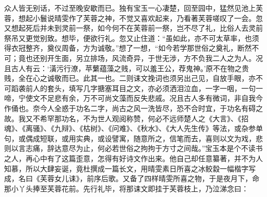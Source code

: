 \begin{parag}
    众人皆无别话，不过至晚安歇而已。独有宝玉一心凄楚，回至园中，猛然见池上芙蓉，想起小鬟说晴雯作了芙蓉之神，不觉又喜欢起来，乃看著芙蓉嗟叹了一会。忽又想起死后并未到灵前一祭，如今何不在芙蓉前一祭，岂不尽了礼，比俗人去灵前祭吊又更觉别致。想毕，便欲行礼。忽又止住道：“虽如此，亦不可太草率，也须得衣冠整齐，奠仪周备，方为诚敬。”想了一想，“如今若学那世俗之奠礼，断然不可；竟也还别开生面，另立排场，风流奇异，于世无涉，方不负我二人之为人。况且古人有云：‘潢污行潦，苹蘩蕴藻之贱，可以羞王公，荐鬼神。’原不在物之贵贱，全在心之诚敬而已。此其一也。二则诔文挽词也须另出己见，自放手眼，亦不可蹈袭前人的套头，填写几字搪塞耳目之文，亦必须洒泪泣血，一字一咽，一句一啼，宁使文不足悲有余，万不可尚文藻而反失悲戚。况且古人多有微词，非自我今作俑也。奈今人全惑于功名二字，尚古之风一洗皆尽，恐不合时宜，于功名有碍之故。我又不希罕那功名，不为世人观阅称赞，何必不远师楚人之《大言》、《招魂》、《离骚》、《九辩》、《枯树》、《问难》、《秋水》、《大人先生传》等法，或杂参单句，或偶成短联，或用实典，或设譬寓，随意所之，信笔而去，喜则以文为戏，悲则以言志痛，辞达意尽为止，何必若世俗之拘拘于方寸之间哉。”宝玉本是个不读书之人，再心中有了这篇歪意，怎得有好诗文作出来。他自己却任意纂著，并不为人知慕，所以大肆妄诞，竟杜撰成一篇长文，用晴雯素日所喜之冰鲛縠一幅楷字写成，名曰《芙蓉女儿诔》，前序后歌。又备了四样晴雯所喜之物，于是夜月下，命那小丫头捧至芙蓉花前。先行礼毕，将那诔文即挂于芙蓉枝上，乃泣涕念曰：
\end{parag}


